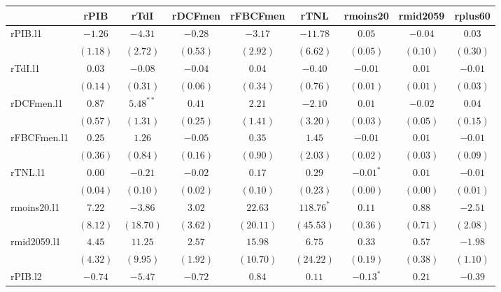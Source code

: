 \documentclass[11pt,]{article}
\begin{document}
\begin{table}[!htbp]
\begin{center}
\begin{tabular}{l c c c c c c c c }
\hline
 & rPIB & rTdI & rDCFmen & rFBCFmen & rTNL & rmoins20 & rmid2059 & rplus60 \\
\hline
rPIB.l1     & $-1.26$  & $-4.31$     & $-0.28$  & $-3.17$   & $-11.78$     & $0.05$      & $-0.04$  & $0.03$   \\
            & $(1.18)$ & $(2.72)$    & $(0.53)$ & $(2.92)$  & $(6.62)$     & $(0.05)$    & $(0.10)$ & $(0.30)$ \\
rTdI.l1     & $0.03$   & $-0.08$     & $-0.04$  & $0.04$    & $-0.40$      & $-0.01$     & $0.01$   & $-0.01$  \\
            & $(0.14)$ & $(0.31)$    & $(0.06)$ & $(0.34)$  & $(0.76)$     & $(0.01)$    & $(0.01)$ & $(0.03)$ \\
rDCFmen.l1  & $0.87$   & $5.48^{**}$ & $0.41$   & $2.21$    & $-2.10$      & $0.01$      & $-0.02$  & $0.04$   \\
            & $(0.57)$ & $(1.31)$    & $(0.25)$ & $(1.41)$  & $(3.20)$     & $(0.03)$    & $(0.05)$ & $(0.15)$ \\
rFBCFmen.l1 & $0.25$   & $1.26$      & $-0.05$  & $0.35$    & $1.45$       & $-0.01$     & $0.01$   & $-0.01$  \\
            & $(0.36)$ & $(0.84)$    & $(0.16)$ & $(0.90)$  & $(2.03)$     & $(0.02)$    & $(0.03)$ & $(0.09)$ \\
rTNL.l1     & $0.00$   & $-0.21$     & $-0.02$  & $0.17$    & $0.29$       & $-0.01^{*}$ & $0.01$   & $-0.01$  \\
            & $(0.04)$ & $(0.10)$    & $(0.02)$ & $(0.10)$  & $(0.23)$     & $(0.00)$    & $(0.00)$ & $(0.01)$ \\
rmoins20.l1 & $7.22$   & $-3.86$     & $3.02$   & $22.63$   & $118.76^{*}$ & $0.11$      & $0.88$   & $-2.51$  \\
            & $(8.12)$ & $(18.70)$   & $(3.62)$ & $(20.11)$ & $(45.53)$    & $(0.36)$    & $(0.71)$ & $(2.08)$ \\
rmid2059.l1 & $4.45$   & $11.25$     & $2.57$   & $15.98$   & $6.75$       & $0.33$      & $0.57$   & $-1.98$  \\
            & $(4.32)$ & $(9.95)$    & $(1.92)$ & $(10.70)$ & $(24.22)$    & $(0.19)$    & $(0.38)$ & $(1.10)$ \\
rPIB.l2     & $-0.74$  & $-5.47$     & $-0.72$  & $0.84$    & $0.11$       & $-0.13^{*}$ & $0.21$   & $-0.39$  \\

\end{tabular}
\end{center}
\end{table}
\end{document}
